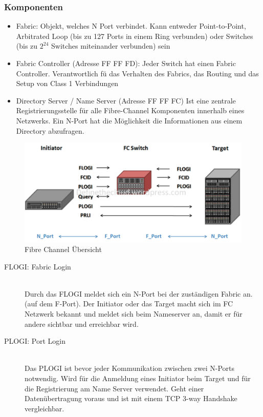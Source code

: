 \subsubsection{Komponenten}
\begin{itemize}
	\item Fabric: Objekt, welches N Port verbindet. Kann entweder Point-to-Point, Arbitrated Loop (bis zu 127 Ports in einem Ring verbunden) oder Switches (bis zu $2^{24}$ Switches miteinander verbunden) sein
	\item Fabric Controller (Adresse FF FF FD): Jeder Switch hat einen Fabric Controller. Verantwortlich fü das Verhalten des Fabrics, das Routing und das Setup von Class 1 Verbindungen
	\item Directory Server / Name Server (Adresse FF FF FC) Ist eine zentrale Registrierungsstelle für alle Fibre-Channel Komponenten innerhalb eines Netzwerks. Ein N-Port hat die Möglichkeit die Informationen aus einem Directory abzufragen.
\end{itemize}

\begin{figure}[h]
	\centering
	\includegraphics[width=0.7\linewidth]{images/flog_plogi}
	\caption{Fibre Channel Übersicht}
\end{figure}

\begin{description}
	\item[FLOGI: Fabric Login] \hfill \\
	Durch das FLOGI meldet sich ein N-Port bei der zuständigen Fabric an. (auf dem F-Port). Der Initiator oder das Target macht sich im FC Netzwerk bekannt und meldet sich beim Nameserver an, damit er für andere sichtbar und erreichbar wird.
	\item[PLOGI: Port Login] \hfill \\ 
	Das PLOGI ist bevor jeder Kommunikation zwischen zwei N-Ports notwendig. Wird für die Anmeldung eines Initiator beim Target und für die Registrierung am Name Server verwendet. Geht einer Datenübertragung voraus und ist mit einem TCP 3-way Handshake vergleichbar.
\end{description}

